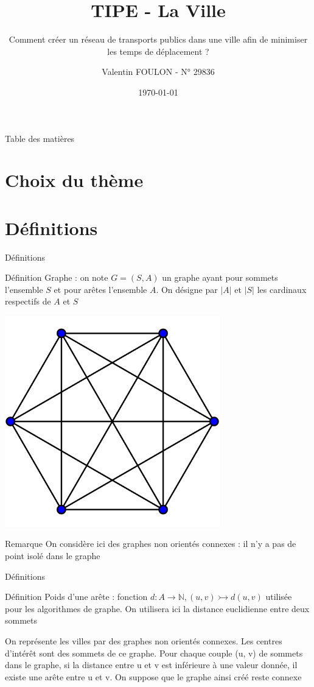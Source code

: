 \documentclass[aspectratio=43,11pt]{beamer}
\title{TIPE - La Ville}
\subtitle{Comment créer un réseau de transports publics dans une ville afin de minimiser les temps de déplacement ?}
\author{Valentin FOULON - N° 29836}
\date{\today}
\begin{document}
\begin{frame}
    \titlepage
\end{frame}
\begin{frame}{Table des matières}
    \tableofcontents
\end{frame}

\section{Choix du thème}

\section{Définitions}
\begin{frame}{Définitions}
    \begin{minipage}{0.7\textwidth}
    \begin{block}{Définition}
        Graphe : on note $G=(S, A)$ un graphe ayant pour sommets l'ensemble $S$ et pour arêtes l'ensemble $A$. On désigne par $|A|$ et $|S|$ les cardinaux respectifs de $A$ et $S$
    \end{block}
    \end{minipage}
    \begin{minipage}{0.25\textwidth}
        \centering
    \includegraphics[width=0.7\textwidth]{graphe_complet}
    \end{minipage}
    \begin{exampleblock}{Remarque}
        On considère ici des graphes non orientés connexes : il n'y a pas de point isolé dans le graphe
    \end{exampleblock}
\end{frame}
\begin{frame}{Définitions}
    \begin{block}{Définition}
        Poids d'une arête : fonction $d : A \rightarrow \mathbb{N}, (u, v) \rightarrowtail d(u, v)$ utilisée pour les algorithmes de graphe. On utilisera ici la distance euclidienne entre deux sommets
    \end{block}
    On représente les villes par des graphes non orientés connexes. Les centres d'intérêt sont des sommets de ce graphe. Pour chaque couple (u, v) de sommets dans le graphe, si la distance entre u et v est inférieure à une valeur donnée, il existe une arête entre u et v. On suppose que le graphe ainsi créé reste connexe
\end{frame}
\end{document}
